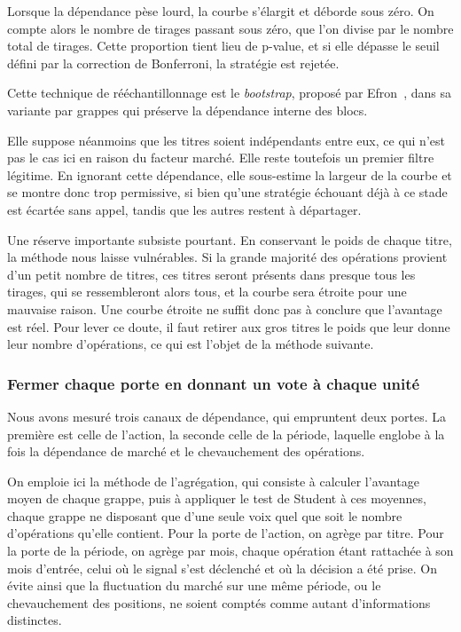 Lorsque la dépendance pèse lourd, la courbe s'élargit et déborde sous zéro. On
compte alors le nombre de tirages passant sous zéro, que l'on divise par le
nombre total de tirages. Cette proportion tient lieu de p-value, et si elle
dépasse le seuil défini par la correction de Bonferroni, la stratégie est
rejetée.

Cette technique de rééchantillonnage est le \emph{bootstrap}, proposé par
Efron~\cite{efron1979}, dans sa variante par grappes qui préserve la
dépendance interne des blocs.

Elle suppose néanmoins que les titres soient indépendants entre eux, ce qui
n'est pas le cas ici en raison du facteur marché. Elle reste toutefois un
premier filtre légitime. En ignorant cette dépendance, elle sous-estime la
largeur de la courbe et se montre donc trop permissive, si bien qu'une
stratégie échouant déjà à ce stade est écartée sans appel, tandis que les
autres restent à départager.

Une réserve importante subsiste pourtant. En conservant le poids de chaque
titre, la méthode nous laisse vulnérables. Si la grande majorité des
opérations provient d'un petit nombre de titres, ces titres seront présents
dans presque tous les tirages, qui se ressembleront alors tous, et la courbe
sera étroite pour une mauvaise raison. Une courbe étroite ne suffit donc pas à
conclure que l'avantage est réel. Pour lever ce doute, il faut retirer aux
gros titres le poids que leur donne leur nombre d'opérations, ce qui est
l'objet de la méthode suivante.

\subsubsection*{Fermer chaque porte en donnant un vote à chaque unité}

Nous avons mesuré trois canaux de dépendance, qui empruntent deux portes. La
première est celle de l'action, la seconde celle de la période, laquelle
englobe à la fois la dépendance de marché et le chevauchement des opérations.

On emploie ici la méthode de l'agrégation, qui consiste à calculer l'avantage
moyen de chaque grappe, puis à appliquer le test de Student à ces moyennes,
chaque grappe ne disposant que d'une seule voix quel que soit le nombre
d'opérations qu'elle contient. Pour la porte de l'action, on agrège par titre.
Pour la porte de la période, on agrège par mois, chaque opération étant
rattachée à son mois d'entrée, celui où le signal s'est déclenché et où la
décision a été prise. On évite ainsi que la fluctuation du marché sur une même
période, ou le chevauchement des positions, ne soient comptés comme autant
d'informations distinctes.

